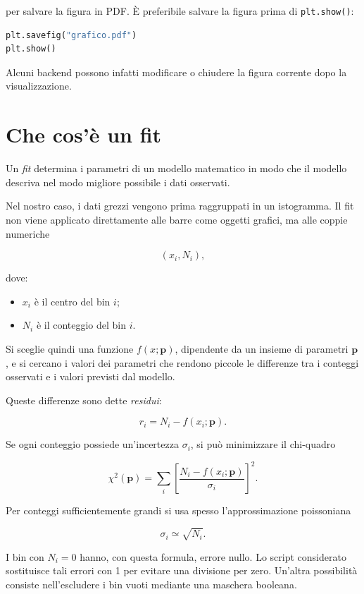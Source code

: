 per salvare la figura in PDF. È preferibile salvare la figura prima di
\texttt{plt.show()}:

\begin{lstlisting}[language=Python]
plt.savefig("grafico.pdf")
plt.show()
\end{lstlisting}

Alcuni backend possono infatti modificare o chiudere la figura corrente
dopo la visualizzazione.

\section{Che cos'è un fit}

Un \emph{fit} determina i parametri di un modello matematico in modo che
il modello descriva nel modo migliore possibile i dati osservati.

Nel nostro caso, i dati grezzi vengono prima raggruppati in un
istogramma. Il fit non viene applicato direttamente alle barre come
oggetti grafici, ma alle coppie numeriche

\[
(x_i,N_i),
\]

dove:

\begin{itemize}
    \item $x_i$ è il centro del bin $i$;
    \item $N_i$ è il conteggio del bin $i$.
\end{itemize}

Si sceglie quindi una funzione $f(x;\boldsymbol{p})$, dipendente da un
insieme di parametri $\boldsymbol{p}$, e si cercano i valori dei
parametri che rendono piccole le differenze tra i conteggi osservati e i
valori previsti dal modello.

Queste differenze sono dette \emph{residui}:

\[
r_i=N_i-f(x_i;\boldsymbol{p}).
\]

Se ogni conteggio possiede un'incertezza $\sigma_i$, si può minimizzare
il chi-quadro

\[
\chi^2(\boldsymbol{p})=
\sum_i
\left[
\frac{N_i-f(x_i;\boldsymbol{p})}{\sigma_i}
\right]^2.
\]

Per conteggi sufficientemente grandi si usa spesso l'approssimazione
poissoniana

\[
\sigma_i\simeq\sqrt{N_i}.
\]

I bin con $N_i=0$ hanno, con questa formula, errore nullo. Lo script
considerato sostituisce tali errori con 1 per evitare una divisione per
zero. Un'altra possibilità consiste nell'escludere i bin vuoti mediante
una maschera booleana.

